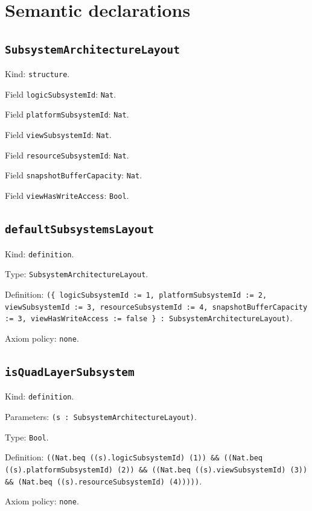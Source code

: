 \documentclass[11pt]{article}
\begin{document}
\section*{Semantic declarations}
\subsection*{\texttt{SubsystemArchitectureLayout}}
\noindent Kind: \texttt{structure}.\par
\noindent Field \texttt{logicSubsystemId}: \texttt{Nat}.\par
\noindent Field \texttt{platformSubsystemId}: \texttt{Nat}.\par
\noindent Field \texttt{viewSubsystemId}: \texttt{Nat}.\par
\noindent Field \texttt{resourceSubsystemId}: \texttt{Nat}.\par
\noindent Field \texttt{snapshotBufferCapacity}: \texttt{Nat}.\par
\noindent Field \texttt{viewHasWriteAccess}: \texttt{Bool}.\par
\subsection*{\texttt{defaultSubsystemsLayout}}
\noindent Kind: \texttt{definition}.\par
\noindent Type: \texttt{SubsystemArchitectureLayout}.\par
\noindent Definition: \texttt{(\{ logicSubsystemId := 1, platformSubsystemId := 2, viewSubsystemId := 3, resourceSubsystemId := 4, snapshotBufferCapacity := 3, viewHasWriteAccess := false \} : SubsystemArchitectureLayout)}.\par
\noindent Axiom policy: \texttt{none}.\par
\subsection*{\texttt{isQuadLayerSubsystem}}
\noindent Kind: \texttt{definition}.\par
\noindent Parameters: \texttt{(s : SubsystemArchitectureLayout)}.\par
\noindent Type: \texttt{Bool}.\par
\noindent Definition: \texttt{((Nat.beq ((s).logicSubsystemId) (1)) \&\& ((Nat.beq ((s).platformSubsystemId) (2)) \&\& ((Nat.beq ((s).viewSubsystemId) (3)) \&\& (Nat.beq ((s).resourceSubsystemId) (4)))))}.\par
\noindent Axiom policy: \texttt{none}.\par
\end{document}
